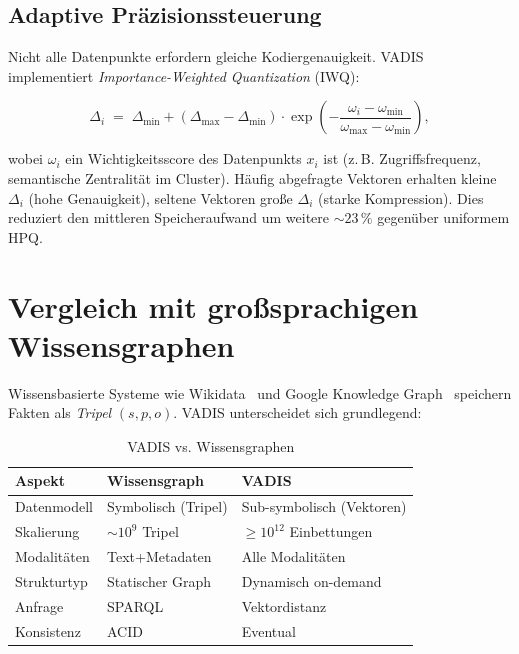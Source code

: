 ﻿\documentclass[12pt,a4paper]{article}
\begin{document}
\subsection{Adaptive Präzisionssteuerung}

Nicht alle Datenpunkte erfordern gleiche Kodiergenauigkeit.
VADIS implementiert \emph{Impor\-tance-Weighted Quantization} (IWQ):

\begin{equation}
  \Delta_i \;=\; \Delta_{\min} + (\Delta_{\max} - \Delta_{\min})
  \cdot \exp\!\left(-\frac{\omega_i - \omega_{\min}}
                          {\omega_{\max} - \omega_{\min}}\right),
\end{equation}

wobei $\omega_i$ ein Wichtigkeitsscore des Datenpunkts $x_i$
ist (z.\,B. Zugriffsfrequenz, semantische Zentralität im
Cluster). Häufig abgefragte Vektoren erhalten kleine $\Delta_i$
(hohe Genauigkeit), seltene Vektoren große $\Delta_i$ (starke
Kompression). Dies reduziert den mittleren Speicheraufwand
um weitere $\sim 23\,\%$ gegenüber uniformem HPQ.

\section{Vergleich mit großsprachigen Wissensgraphen}
\label{sec:kg}

Wissensbasierte Systeme wie Wikidata~\cite{vrandevcic2014wikidata}
und Google Knowledge Graph~\cite{singhal2012kg} speichern
Fakten als \emph{Tripel} $(s, p, o)$. VADIS unterscheidet sich
grundlegend:

\begin{table}[ht]
\centering
\small
\caption{VADIS vs. Wissensgraphen}
\label{tab:vs_kg}
\begin{tabular}{@{}p{1.8cm}p{2.4cm}p{2.4cm}@{}}
\toprule
\textbf{Aspekt} & \textbf{Wissensgraph} & \textbf{VADIS} \\
\midrule
Datenmodell & Symbolisch (Tripel) & Sub-symbolisch (Vektoren) \\
Skalierung & $\sim 10^9$ Tripel & $\geq 10^{12}$ Einbettungen \\
Modalitäten & Text+Metadaten & Alle Modalitäten \\
Strukturtyp & Statischer Graph & Dynamisch on-demand \\
Anfrage & SPARQL & Vektordistanz \\
Konsistenz & ACID & Eventual \\
\bottomrule
\end{tabular}
\end{table}
\end{document}
